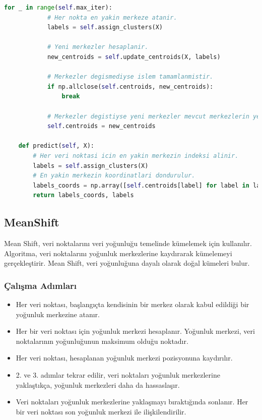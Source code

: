 \begin{lstlisting}[language=Python, caption=Scikit-learn'de KMeans örneği.]
        for _ in range(self.max_iter):
            # Her nokta en yakin merkeze atanir.
            labels = self.assign_clusters(X)

            # Yeni merkezler hesaplanir.
            new_centroids = self.update_centroids(X, labels)

            # Merkezler degismediyse islem tamamlanmistir.
            if np.allclose(self.centroids, new_centroids):
                break

            # Merkezler degistiyse yeni merkezler mevcut merkezlerin yerine atanir.
            self.centroids = new_centroids

    def predict(self, X):
        # Her veri noktasi icin en yakin merkezin indeksi alinir.
        labels = self.assign_clusters(X)
        # En yakin merkezin koordinatlari dondurulur.
        labels_coords = np.array([self.centroids[label] for label in labels]).astype("float32")
        return labels_coords, labels
\end{lstlisting}

\newpage

\subsection{MeanShift}
Mean Shift, veri noktalarını veri yoğunluğu temelinde kümelemek için kullanılır. Algoritma, veri noktalarını yoğunluk merkezlerine kaydırarak kümelemeyi gerçekleştirir. Mean Shift, veri yoğunluğuna dayalı olarak doğal kümeleri bulur.

\subsubsection{Çalışma Adımları}
\begin{itemize}
    \item Her veri noktası, başlangıçta kendisinin bir merkez olarak kabul edildiği bir yoğunluk merkezine atanır.
    \item Her bir veri noktası için yoğunluk merkezi hesaplanır. Yoğunluk merkezi, veri noktalarının yoğunluğunun maksimum olduğu noktadır.
    \item Her veri noktası, hesaplanan yoğunluk merkezi pozisyonuna kaydırılır.
    \item 2. ve 3. adımlar tekrar edilir, veri noktaları yoğunluk merkezlerine yaklaştıkça, yoğunluk merkezleri daha da hassaslaşır.
    \item Veri noktaları yoğunluk merkezlerine yaklaşmayı bıraktığında sonlanır. Her bir veri noktası son yoğunluk merkezi ile ilişkilendirilir.
\end{itemize}

